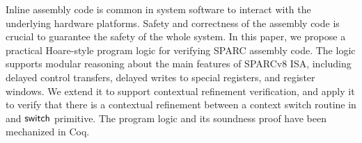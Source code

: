 Inline assembly code is common in system software to interact with
the underlying hardware platforms. Safety and correctness of the
assembly code is crucial to guarantee the safety of the whole
system. In this paper, we propose a practical Hoare-style program
logic for verifying SPARC assembly code. The logic supports
modular reasoning about the main features of SPARCv8 ISA, including
delayed control transfers, delayed writes to special registers,
and register windows. We extend it to support contextual refinement 
verification, and apply it to verify that there is a contextual 
refinement between a context switch routine in \sparc{} and 
$\mathsf{switch}{}$ primitive. The program logic and its soundness proof 
have been mechanized in Coq. 
